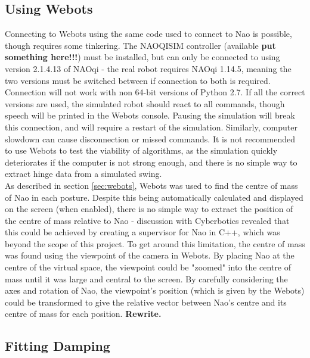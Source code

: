 \documentclass[11pt]{article}
\newcommand*\ruleline[1]{\par\noindent\raisebox{.8ex}{\makebox[\linewidth]{\hrulefill\hspace{1ex}\raisebox{-.8ex}{#1}\hspace{1ex}\hrulefill}}}
\begin{document}
\subsection{Using Webots} \label{sec:usingwebots}
\ruleline{James Doering}
Connecting to Webots using the same code used to connect to Nao is possible, though requires some tinkering. The NAOQISIM controller (available \textbf{put something here!!!}) must be installed, but can only be connected to using version 2.1.4.13 of NAOqi - the real robot requires NAOqi 1.14.5, meaning the two versions must be switched between if connection to both is required. Connection will not work with non 64-bit versions of Python 2.7. If all the correct versions are used, the simulated robot should react to all commands, though speech will be printed in the Webots console. Pausing the simulation will break this connection, and will require a restart of the simulation. Similarly, computer slowdown can cause disconnection or missed commands. It is not recommended to use Webots to test the viability of algorithms, as the simulation quickly deteriorates if the computer is not strong enough, and there is no simple way to extract hinge data from a simulated swing. \\


As described in section \ref{sec:webots}, Webots was used to find the centre of mass of Nao in each posture. Despite this being automatically calculated and displayed on the screen (when enabled), there is no simple way to extract the position of the centre of mass relative to Nao - discussion with Cyberbotics revealed that this could be achieved by creating a supervisor for Nao in C++, which was beyond the scope of this project. To get around this limitation, the centre of mass was found using the viewpoint of the camera in Webots. By placing Nao at the centre of the virtual space, the viewpoint could be "zoomed" into the centre of mass until it was large and central to the screen. By carefully considering the axes and rotation of Nao, the viewpoint's position (which is given by the Webots) could be transformed to give the relative vector between Nao's centre and its centre of mass for each position. \textbf{Rewrite.}



\subsection{Fitting Damping}\label{sec:dampingboring}
\ruleline{James Doering}
\end{document}
